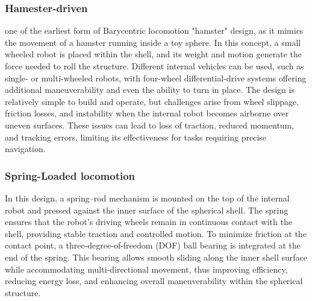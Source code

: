 \documentclass[english, bachelor, utf8]{base/thesis_telematics}
\begin{document}
\subsubsection{Hamester-driven}
one of the earliest form of Barycentric locomotion "hamster" design, as it mimics the movement of a hamster running inside a toy sphere. 
In this concept, a small wheeled robot is placed within the shell, and its weight and motion generate the force needed to roll the structure. Different internal vehicles can be used, such as single- or multi-wheeled robots, with four-wheel differential-drive systems offering additional maneuverability and even the ability to turn in place. 
The design is relatively simple to build and operate, but challenges arise from wheel slippage, friction losses, and instability when the internal robot becomes airborne over uneven surfaces. 
These issues can lead to loss of traction, reduced momentum, and tracking errors, limiting its effectiveness for tasks requiring precise navigation.~\cite{flywheel_hamaster_explanation}

\subsubsection{Spring-Loaded locomotion}
In this design, a spring–rod mechanism is mounted on the top of the internal robot and pressed against the inner surface of the spherical shell. 
The spring ensures that the robot’s driving wheels remain in continuous contact with the shell, providing stable traction and controlled motion. 
To minimize friction at the contact point, a three-degree-of-freedom (DOF) ball bearing is integrated at the end of the spring. 
This bearing allows smooth sliding along the inner shell surface while accommodating multi-directional movement, thus improving efficiency, reducing energy loss, and enhancing overall maneuverability within the spherical structure.~\cite{old_spring_paper,flywheel_hamaster_explanation,SpheriDrive}
\end{document}
